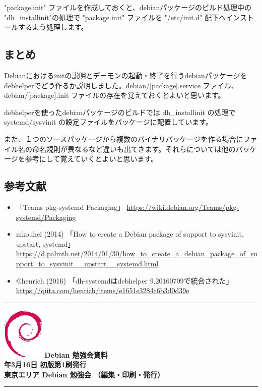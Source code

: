 \documentclass[mingoth,a4paper]{jsarticle}
\newcommand{\debmtgyear}{2019}
\newcommand{\debmtgmonth}{3}
\newcommand{\debmtgdate}{16}
\begin{document}
"package.init" ファイルを作成しておくと、debianパッケージのビルド処理中の "dh\_installinit"の処理で "package.init" ファイルを "/etc/init.d" 配下へインストールするよう処理します。


\subsection{まとめ}

Debianにおけるinitの説明とデーモンの起動・終了を行うdebianパッケージをdebhelperでどう作るか説明しました。debian/[package].service ファイル、debian/[package].init ファイルの存在を覚えておくとよいと思います。


debhelperを使ったdebianパッケージのビルドでは  dh\_installinit の処理で systemd/sysvinit の設定ファイルをパッケージに配置しています。


また、１つのソースパッケージから複数のバイナリパッケージを作る場合にファイル名の命名規則が異なるなど違いも出てきます。それらについては他のパッケージを参考にして覚えていくとよいと思います。


\subsection{参考文献}

\begin{itemize}
\item 「Teams pkg-systemd Packaging」 \url{https://wiki.debian.org/Teams/pkg-systemd/Packaging}
\item mkouhei (2014) 「How to create a Debian package of support to sysvinit, upstart, systemd」 \url{https://d.palmtb.net/2014/01/30/how_to_create_a_debian_package_of_support_to_sysvinit__upstart__systemd.html}
\item @henrich (2016) 「dh-systemdはdebhelper 9.20160709で統合された」 \url{https://qiita.com/henrich/items/e1651e3284c6b3d0d39e}
\end{itemize}


%
\mbox{}\newpage

\vspace*{15cm}
\hrule
\vspace{2mm}
\includegraphics[width=2cm]{image200502/openlogo-nd.eps}
\noindent \Large \bf Debian 勉強会資料\\
\noindent \normalfont \debmtgyear{}年\debmtgmonth{}月\debmtgdate{}日 \hspace{5mm}  初版第1刷発行\\
\noindent \normalfont 東京エリア Debian 勉強会 （編集・印刷・発行）\\
\hrule
\end{document}
